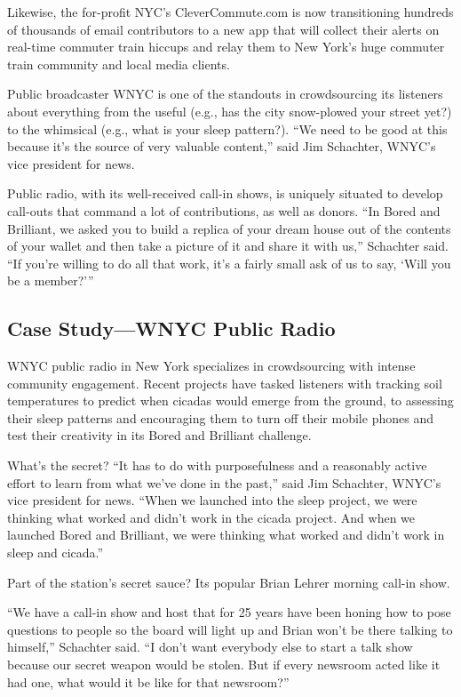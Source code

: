 \begin{itemize}
\begin{itemize}
Likewise, the for-profit NYC’s CleverCommute.com is now transitioning hundreds of thousands of email contributors to a new app that will collect their alerts on real-time commuter train hiccups and relay them to New York’s huge commuter train community and local media clients.\autocite{Commute}

Public broadcaster WNYC is one of the standouts in crowdsourcing its listeners about everything from the useful (e.g., has the city snow-plowed your street yet?) to the whimsical (e.g., what is your sleep pattern?).
``We need to be good at this because it’s the source of very valuable content,'' said Jim Schachter, WNYC’s vice president for news.\autocite{Schachter}

Public radio, with its well-received call-in shows, is uniquely situated to develop call-outs that command a lot of contributions, as well as donors. ``In Bored and Brilliant, we asked you to build a replica of your dream house out of the contents of your wallet and then take a picture of it and share it with us,'' Schachter said. ``If you’re willing to do all that work, it’s a fairly small ask of us to say, ‘Will you be a member?’''


\subsection{Case Study---WNYC Public Radio}

WNYC public radio in New York specializes in crowdsourcing with intense community engagement. Recent projects have tasked listeners with tracking soil temperatures to predict when cicadas would emerge from the ground, to assessing their sleep patterns and encouraging them to turn off their mobile phones and test their creativity in its Bored and Brilliant challenge.

What’s the secret? ``It has to do with purposefulness and a reasonably active effort to learn from what we’ve done in the past,'' said Jim Schachter, WNYC’s vice president for news. ``When we launched into the sleep project, we were thinking what worked and didn’t work in the cicada project. And when we launched Bored and Brilliant, we were thinking what worked and didn’t work in sleep and cicada.''

Part of the station’s secret sauce? Its popular Brian Lehrer morning call-in show. 

``We have a call-in show and host that for 25 years have been honing how to pose questions to people so the board will light up and Brian won’t be there talking to himself,'' Schachter said. ``I don’t want everybody else to start a talk show because our secret weapon would be stolen. But if every newsroom acted like it had one, what would it be like for that newsroom?''


\end{itemize}
\end{itemize}
